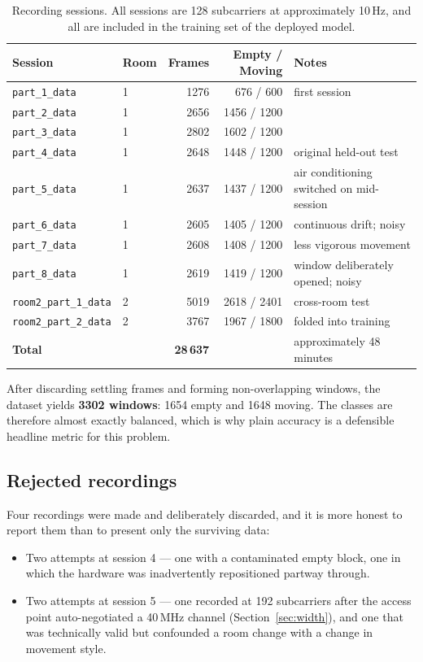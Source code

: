\documentclass[11pt,a4paper]{article}
\newcommand{\code}[1]{\texttt{\small #1}}
\begin{document}
\begin{table}[H]
\centering
\caption{Recording sessions. All sessions are 128 subcarriers at approximately
10\,Hz, and all are included in the training set of the deployed model.}
\label{tab:dataset}
\begin{tabular}{@{}llrrl@{}}
\toprule
\textbf{Session} & \textbf{Room} & \textbf{Frames} & \textbf{Empty / Moving} & \textbf{Notes} \\
\midrule
\code{part\_1\_data} & 1 & 1276 & 676 / 600 & first session \\
\code{part\_2\_data} & 1 & 2656 & 1456 / 1200 & \\
\code{part\_3\_data} & 1 & 2802 & 1602 / 1200 & \\
\code{part\_4\_data} & 1 & 2648 & 1448 / 1200 & original held-out test \\
\code{part\_5\_data} & 1 & 2637 & 1437 / 1200 & air conditioning switched on mid-session \\
\code{part\_6\_data} & 1 & 2605 & 1405 / 1200 & continuous drift; noisy \\
\code{part\_7\_data} & 1 & 2608 & 1408 / 1200 & less vigorous movement \\
\code{part\_8\_data} & 1 & 2619 & 1419 / 1200 & window deliberately opened; noisy \\
\code{room2\_part\_1\_data} & 2 & 5019 & 2618 / 2401 & cross-room test \\
\code{room2\_part\_2\_data} & 2 & 3767 & 1967 / 1800 & folded into training \\
\midrule
\textbf{Total} & & \textbf{28\,637} & & approximately 48 minutes \\
\bottomrule
\end{tabular}
\end{table}

\noindent
After discarding settling frames and forming non-overlapping windows, the
dataset yields \textbf{3302 windows}: 1654 empty and 1648 moving. The classes
are therefore almost exactly balanced, which is why plain accuracy is a
defensible headline metric for this problem.

\subsection{Rejected recordings}

Four recordings were made and deliberately discarded, and it is more honest to
report them than to present only the surviving data:

\begin{itemize}[leftmargin=1.4em, itemsep=2pt]
  \item Two attempts at session 4 --- one with a contaminated empty block, one
        in which the hardware was inadvertently repositioned partway through.
  \item Two attempts at session 5 --- one recorded at 192 subcarriers after the
        access point auto-negotiated a 40\,MHz channel
        (Section~\ref{sec:width}), and one that was technically valid but
        confounded a room change with a change in movement style.
\end{itemize}
\end{document}
